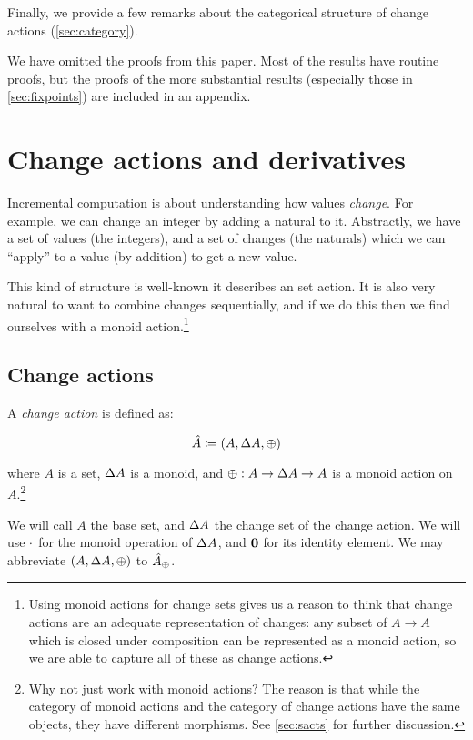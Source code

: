 Finally, we provide a few remarks about the categorical structure of change
actions (\cref{sec:category}).

We have omitted the proofs from this paper. Most of the results have routine
proofs, but the proofs of the more substantial results
(especially those in \cref{sec:fixpoints}) are included in an appendix.

\section{Change actions and derivatives}
\label{sec:changeActions}

Incremental computation is about understanding how values \emph{change}. For
example, we can change an integer by adding a natural to it.
Abstractly, we have a set of values (the integers), and a set of changes
(the naturals) which we can ``apply'' to a value (by addition) to get a new value.

This kind of structure is well-known \textemdash{} it describes an set action. It is
also very natural to want to combine changes sequentially, and if we do this
then we find ourselves with a monoid action.\footnote{
Using monoid actions for change sets gives us a reason to think that
change actions are an adequate representation of changes: any subset of $A
\rightarrow A$ which is closed under composition can be
represented as a monoid action, so we are able to capture all of these as change
actions.}

\subsection{Change actions}

\begin{defn}
  A \emph{change action} is defined as:

  \begin{displaymath}
    \hat{A} \coloneqq (A,\Delta A,\oplus)
  \end{displaymath}

  where $A$ is a set, $\Delta A$ is a monoid, and $\oplus : A \rightarrow
  \Delta A \rightarrow A$ is a monoid action on $A$.\footnote{Why not
    just work with monoid actions? The reason is that while the category of
    monoid actions and the category of change actions have the same objects, they
  have different morphisms. See \cref{sec:sacts} for further discussion.}

  We will call $A$ the base set, and $\Delta A$ the change set of the change
  action. We will use $\cdot$ for the monoid operation of $\Delta A$, and
  $\mathbf{0}$ for its identity element. We may abbreviate $(A,\Delta A,\oplus)$ to $\hat{A}_\oplus$.
\end{defn}

